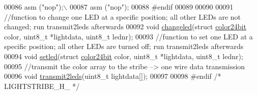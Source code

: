 \begin{DoxyCode}
00086 \textcolor{preprocessor}{               asm ("nop");\(\backslash\)}
00087 \textcolor{preprocessor}{               asm ("nop");}
00088 \textcolor{preprocessor}{#endif}
00089 
00090 
00091 \textcolor{comment}{//function to change one LED at a specific position; all other LEDs are not changed; run transmit2leds
       afterwards}
00092 \textcolor{keywordtype}{void} \hyperlink{_lightstribe_8h_a63fa595d401f0e85c1bba55ba2b1d66e}{changeled}(\textcolor{keyword}{struct} \hyperlink{structcolor24bit}{color24bit} color, uint8\_t *lightdata, uint8\_t lednr);
00093 \textcolor{comment}{//function to set one LED at a specific position; all other LEDs are turned off; run transmit2leds
       afterwards}
00094 \textcolor{keywordtype}{void} \hyperlink{_lightstribe_8h_abba9462833e30ef725eaf18c3d01eb71}{setled}(\textcolor{keyword}{struct} \hyperlink{structcolor24bit}{color24bit} color, uint8\_t *lightdata, uint8\_t lednr);
00095 \textcolor{comment}{//transmit the color array to the stribe --> one wire data transmission}
00096 \textcolor{keywordtype}{void} \hyperlink{_lightstribe_8h_aac724dad670e4a26723daf71ce6a8d8a}{transmit2leds}(uint8\_t lightdata[]);
00097 
00098 \textcolor{preprocessor}{#endif }\textcolor{comment}{/* LIGHTSTRIBE\_H\_ */}\textcolor{preprocessor}{}
\end{DoxyCode}
